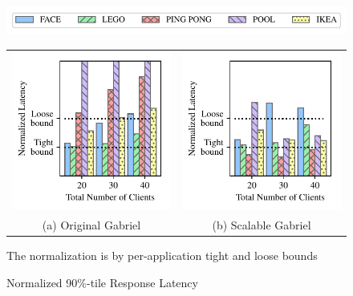 \begin{figure}[]
	\begin{center}
		\includegraphics[width=\linewidth]{FIGS/fig-alloc-latency-legend.pdf}
								
		\begin{tabular}{c@{}c}
			\includegraphics[width=.5\linewidth]{FIGS/fig-eval-latency-baseline.pdf}
			            & \includegraphics[width=.5\linewidth]{FIGS/fig-eval-latency-cpushares.pdf} \\
			{(a) Original  Gabriel} & {(b) Scalable Gabriel}                                                    
		\end{tabular}
	\end{center}

\begin{captiontext}
\centering
The normalization is by per-application tight and loose bounds~\cite{chen2017empirical}
\end{captiontext}
\vspace{-0.1in}
	\caption{Normalized 90\%-tile Response Latency}
	\label{fig:frame-latency}
\end{figure}

